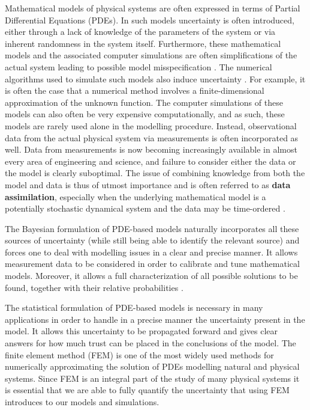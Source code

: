 
Mathematical models of physical systems are often expressed in terms of Partial Differential Equations (PDEs). In such models uncertainty is often introduced, either through a lack of knowledge of the parameters of the system or via inherent randomness in the system itself. Furthermore, these mathematical models and the associated computer simulations are often simplifications of the actual system leading to possible model misspecification \textcolor{blue}{\cite{girolami2019statistical}}. The numerical algorithms used to simulate such models also induce uncertainty \textcolor{blue}{\cite{conrad2017statistical}}. For example, it is often the case that a numerical method involves a finite-dimensional approximation of the unknown function. The computer simulations of these models can also often be very expensive computationally, and as such, these models are rarely used alone in the modelling procedure. Instead, observational data from the actual physical system via measurements is often incorporated as well. Data from measurements is now becoming increasingly available in almost every area of engineering and science, and failure to consider either the data or the model is clearly suboptimal. The issue of combining knowledge from both the model and data is thus of utmost importance and is often referred to as \textbf{data assimilation}, especially when the underlying mathematical model is a potentially stochastic dynamical system and the data may be time-ordered \textcolor{blue}{\cite{law2015data}}.

The Bayesian formulation of PDE-based models naturally incorporates all these sources of uncertainty (while still being able to identify the relevant source) and forces one to deal with modelling issues in a clear and precise manner. It allows measurement data to be considered in order to calibrate and tune mathematical models. Moreover, it allows a full characterization of all possible solutions to be found, together with their relative probabilities \textcolor{blue}{\cite{stuart2010inverse}}.

The statistical formulation of PDE-based models is necessary in many applications in order to handle in a precise manner the uncertainty present in the model. It allows this uncertainty to be propagated forward and gives clear answers for how much trust can be placed in the conclusions of the model. The finite element method (FEM) \textcolor{blue}{\cite{strang1973analysis}} is one of the most widely used methods for numerically approximating the solution of PDEs modelling natural and physical systems. Since FEM is an integral part of the study of many physical systems it is essential that we are able to fully quantify the uncertainty that using FEM introduces to our models and simulations.

